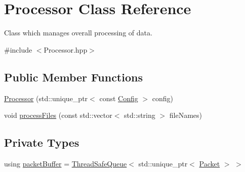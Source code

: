 \hypertarget{class_processor}{}\section{Processor Class Reference}
\label{class_processor}


Class which manages overall processing of data.  




{\ttfamily \#include $<$Processor.\+hpp$>$}

\subsection*{Public Member Functions}
\begin{DoxyCompactItemize}
\item 
\hyperlink{class_processor_a1cc4421ebb02f40665336598c1334c55}{Processor} (std\+::unique\+\_\+ptr$<$ const \hyperlink{class_config}{Config} $>$ config)
\item 
void \hyperlink{class_processor_a4186d391ddee1f68d763931dad346c4a}{process\+Files} (const std\+::vector$<$ std\+::string $>$ file\+Names)
\end{DoxyCompactItemize}
\subsection*{Private Types}
\begin{DoxyCompactItemize}
\item 
using \hyperlink{class_processor_a0cfd8ed0721769db91c142a19a392e0f}{packet\+Buffer} = \hyperlink{class_thread_safe_queue}{Thread\+Safe\+Queue}$<$ std\+::unique\+\_\+ptr$<$ \hyperlink{class_packet}{Packet} $>$ $>$
\end{DoxyCompactItemize}

